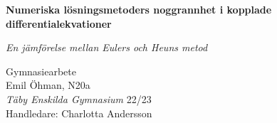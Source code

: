 \begin{titlepage}

\vspace*{8.5em}

\begin{center}
    {\Huge\bfseries Numeriska lösningsmetoders noggrannhet i kopplade differentialekvationer\par}
    
    \vspace{2em}
    
    {\Large\itshape En jämförelse mellan Eulers och Heuns metod\par}

    \vfill
    
    {%
        Gymnasiearbete\\
        Emil Öhman, N20a\\
        \textit{Täby Enskilda Gymnasium} 22/23\\
        \vspace{1em}
        Handledare: Charlotta Andersson\\
    }
\end{center}
\restoregeometry
\end{titlepage}